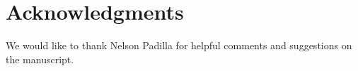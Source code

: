 \documentclass[a4,useAMS,usenatbib,usegraphicx]{mn2e}
\begin{document}
\section*{Acknowledgments}  


We would like to thank Nelson Padilla for helpful comments and suggestions
on the manuscript.




\end{document}
